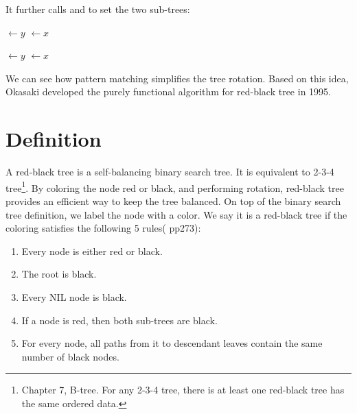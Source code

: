 \documentclass[b5paper]{article}
\begin{document}
\begin{algorithmic}[1]
  \State {}
  \State {}
\EndFunction
\end{algorithmic}

It further calls  and  to set the two sub-trees:

\begin{algorithmic}[1]
  \State {} $\gets y$
     $\gets x$
  \EndIf
  \EndFunction

\Statex

  \State {} $\gets y$
     $\gets x$
  \EndIf
\EndFunction
\end{algorithmic}

We can see how pattern matching simplifies the tree rotation. Based on this idea, Okasaki developed the purely functional algorithm for red-black tree in 1995\cite{okasaki}.

\begin{Exercise}
\end{Exercise}

\section{Definition}

A red-black tree is a self-balancing binary search tree\cite{wiki-rbt}. It is equivalent to 2-3-4 tree\footnote{Chapter 7, B-tree. For any 2-3-4 tree, there is at least one red-black tree has the same ordered data.}. By coloring the node red or black, and performing rotation, red-black tree provides an efficient way to keep the tree balanced. On top of the binary search tree definition, we label the node with a color. We say it is a red-black tree if the coloring satisfies the following 5 rules(\cite{CLRS} pp273):

\begin{enumerate}
\item Every node is either red or black.
\item The root is black.
\item Every NIL node is black.
\item If a node is red, then both sub-trees are black.
\item For every node, all paths from it to descendant leaves contain the same number of black nodes.
\end{enumerate}
\end{document}
